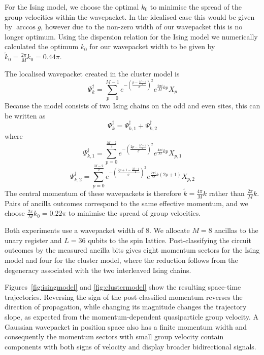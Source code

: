 \documentclass[aps,floatfix,10pt,amssymb,amsfont,amsmath,superscriptaddress,float,nofootinbib,longbibliography,nobalancelastpage,twocolumn]{revtex4-2}
\begin{document}
For the Ising model, we choose the optimal $k_0$ to minimise the spread of the group velocities within the wavepacket. In the idealised case this would be given by $\arccos g$, however due to the non-zero width of our wavepacket this is no longer optimum. Using the dispersion relation for the Ising model we numerically calculated the optimum $k_0$ for our wavepacket width to be given by $\tilde k_0 = \frac{2\pi }{M}k_0=0.44\pi$.

The localised wavepacket created in the cluster model is
\begin{equation}
    \Psi_k^{\dagger} = \sum_{p=0}^{M-1} e^{-\left(\frac{p-\frac{M-1}{2}}{\sigma}\right)^2}e^{\frac{2\pi i}{M}k p} X_p 
\end{equation}
Because the model consists of two Ising chains on the odd and even sites, this can be written as
\begin{equation}
    \Psi_k^{\dagger} = \Psi_{k,1}^{\dagger} +\Psi_{k,2}^{\dagger}
\end{equation}
where
\begin{equation}
        \Psi_{k,1}^{\dagger} = \sum_{p=0}^{\frac{M-2}{2}} e^{-\left(\frac{2p-\frac{M-1}{2}}{\sigma}\right)^2}e^{\frac{4\pi i}{M}k p} X_{p,1} 
\end{equation}
\begin{equation}
        \Psi_{k,2}^{\dagger} = \sum_{p=0}^{\frac{M-2}{2}} e^{-\left(\frac{2p+1-\frac{M-1}{2}}{\sigma}\right)^2}e^{\frac{2\pi i}{M}k (2p+1)} X_{p,2} 
\end{equation}
The central momentum of these wavepackets is therefore $\tilde k =\frac{4\pi}{M}k$ rather than $\frac{2\pi}{M}k$. Pairs of ancilla outcomes correspond to the same effective momentum, and we choose $\frac{2\pi }{M}k_0=0.22\pi$ to minimise the spread of group velocities.

Both experiments use a wavepacket width of 8. We allocate $M=8$ ancillas to the unary register and $L=36$ qubits to the spin lattice. Post-classifying the circuit outcomes by the measured ancilla bits gives eight momentum sectors for the Ising model and four for the cluster model, where the reduction follows from the degeneracy associated with the two interleaved Ising chains.

Figures~\ref{fig:isingmodel} and \ref{fig:clustermodel} show the resulting space-time trajectories. Reversing the sign of the post-classified momentum reverses the direction of propagation, while changing its magnitude changes the trajectory slope, as expected from the momentum-dependent quasiparticle group velocity. A Gaussian wavepacket in position space also has a finite momentum width and consequently the momentum sectors with small group velocity contain components with both signs of velocity and display broader bidirectional signals.
\end{document}
